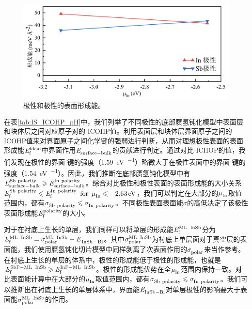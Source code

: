 \begin{figure}[htb]
    \includegraphics{pic/IS_DFT_surfaceE_InPSbP.png}
    \caption{极性和极性的表面形成能。}
    \label{fig:IS_DFT_surfaceE_InPSbP}
\end{figure}

在表\ref{tab:IS_ICOHP_pH}中，我们列举了不同极性的底部赝氢钝化模型中表面层和块体层之间对应原子对的-ICOHP值。利用表面层和块体层界面原子之间的-ICOHP值来对界面原子之间化学键的强弱进行判断，从而对理想极性表面的表面形成能$\it E_{\rm f}^{\rm ideal} \it$中界面作用$\it E_{\rm surface-bulk}^{\rm } \it$的贡献进行判定。通过对比-ICHOP的值，我们发现在极性的界面-键的强度（\SI{1.59}{\electronvolt\per\pair}）略微大于在极性表面中的界面-键的强度（\SI{1.54}{\electronvolt\per\pair}）。因此，我们推断在底部赝氢钝化模型中有$\energyVar{surface-bulk}{Sb\ polarity}\geqslant\energyVar{surface-bulk}{In\ polarity}$。综合对比极性和极性表面的表面形成能的大小关系$\it E_{\rm f}^{\rm Sb\ polarity} \it \leqslant \it E_{\rm f}^{\rm In\ polarity} \it\enspace \rm{for} \enspace \it \mu_{\rm In}^{\rm } \it \leqslant \SI{-2.63}{\electronvolt}$，我们可以判定在大部分的$\it \mu_{\rm In}^{\rm } \it$取值范围内，都有$\sigmaVar{Sb\ polarity}{} \leqslant \sigmaVar{In\ polarity}{}$。不同极性表面表面能$\sigma$的高低决定了该极性表面形成能$\it E_{\rm f}^{\rm polarity} \it$的大小。



对于在衬底上生长的单层，我们同样可以将单层的形成能$\energyVar{f}{ML\ \cemb{InSb}}$分为$\energyVar{f}{ML\ \cemb{InSb}}=\sigmaVar{polar}{ML\ \cemb{InSb}}+\energyVar{\cemb{InSb}-\cemb{Bi}}{}$。其中$\sigmaVar{polar}{ML\ \cemb{InSb}}$为衬底上单层面对于真空层的表面能，我们使用赝氢钝化切片模型中同样剥离了次表面作用的$\it \sigma_{\rm polar}^{\rm } \it$来当作参考。在衬底上生长的单层的体系中，极性的形成能低于极性的形成能，也就是$\energyVar{f}{SbP-ML\ \cemb{InSb}} \geqslant \energyVar{f}{InP-ML\ \cemb{InSb}}$。极性的形成能优势在全$\it \mu_{\rm In}^{\rm } \it$范围内保持一致。对比表面能计算中在大部分的$\it \mu_{\rm In}^{\rm } \it$取值范围内，都有$\sigmaVar{Sb\ polarity}{} \leqslant \sigmaVar{In\ polarity}{}$。我们可以推断出在衬底上生长的单层体系中，界面能$\it E_{\rm InSb-Bi}^{\rm } \it$对单层极性的影响要大于表面能$\sigmaVar{polar}{ML\ \cemb{InSb}}$的作用。

